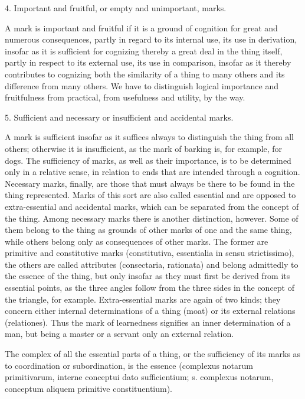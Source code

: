 4. Important and fruitful, or empty and unimportant, marks.

A mark is important and fruitful if it is a ground of cognition for great
and numerous consequences, partly in regard to its internal use, its use in
derivation, insofar as it is sufficient for cognizing thereby a great deal in
the thing itself, partly in respect to its external use, its use in comparison,
insofar as it thereby contributes to cognizing both the similarity of a thing
to many others and its difference from many others.
We have to distinguish logical importance and fruitfulness from practical,
from usefulness and utility, by the way.

5. Sufficient and necessary or insufficient and accidental marks.

A mark is sufficient insofar as it suffices always
to distinguish the thing from all others;
otherwise it is insufficient, as the mark of barking is,
for example, for dogs.
The sufficiency of marks, as well as their importance,
is to be determined only in a relative sense,
in relation to ends that are intended through a cognition.
Necessary marks, finally, are those that must always be there to be found
in the thing represented.
Marks of this sort are also called essential and are
opposed to extra-essential and accidental marks,
which can be separated from the concept of the thing.
Among necessary marks there is another distinction, however.
Some of them belong to the thing as grounds of other marks of one and
the same thing, while others belong only as consequences of other marks.
The former are primitive and constitutive marks
(constitutiva, essentialia in sensu strictissimo),
the others are called attributes (consectaria, rationata)
and belong admittedly to the essence of the thing,
but only insofar as they must first be derived from its essential points,
as the three angles follow from the three sides
in the concept of the triangle, for example.
Extra-essential marks are again of two kinds;
they concern either internal determinations of a thing (moat) or
its external relations (relationes).
Thus the mark of learnedness signifies an inner determination of a man,
but being a master or a servant only an external relation.

The complex of all the essential parts of a thing, or the sufficiency of its
marks as to coordination or subordination, is the essence
(complexus notarum primitivarum, interne conceptui dato sufficientium;
s. complexus notarum, conceptum aliquem primitive constituentium).

